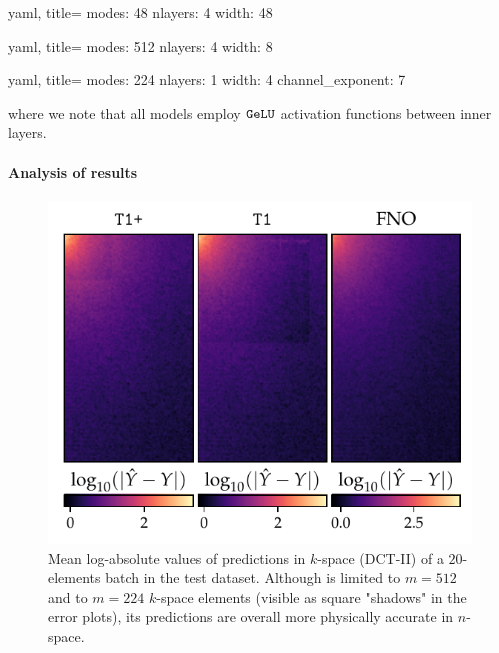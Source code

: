 \begin{listing}[H]
\begin{minipage}[t]{0.32\textwidth}
\begin{mintedbox}{yaml, title=}
modes: 48
nlayers: 4
width: 48 \end{mintedbox}
\end{minipage}
%
\begin{minipage}[t]{0.32\textwidth}
\begin{mintedbox}{yaml, title=\config{\ourmethod{}}}
modes: 512
nlayers: 4
width: 8  \end{mintedbox}
\end{minipage}
%
\begin{minipage}[t]{0.32\textwidth}
\begin{mintedbox}{yaml, title=\config{\ourmethod{+}}}
modes: 224
nlayers: 1
width: 4
channel_exponent: 7 \end{mintedbox}
\end{minipage}
\vspace{-6mm}
\end{listing}

where we note that all models employ $\tt GeLU$ \citep{hendrycks2016gaussian} activation functions between inner layers. 


\paragraph{Analysis of results}
\begin{figure}[h!]
    \centering
    \includegraphics[width=0.4\linewidth]{figures/scalarflow_dct_errors_batch.pdf}
    \vspace{-3.5mm}
    \caption{\small Mean log-absolute values of predictions in $k$-space (DCT-II) of a $20$-elements batch in the test dataset. Although \ourmethod{} is limited to $m=512$ and \ourmethod{+} to $m=224$ $k$-space elements (visible as square "shadows" in the error plots), its predictions are overall more physically accurate in $n$-space.}
    \label{fig:scalarflow-dct-batch-error}
\end{figure}

